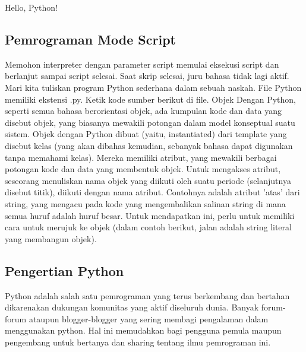 Hello, Python!

\subsection{Pemrograman Mode Script}
Memohon interpreter dengan parameter script memulai eksekusi script dan berlanjut sampai script selesai. Saat skrip selesai, juru bahasa tidak lagi aktif. Mari kita tuliskan program Python sederhana dalam sebuah naskah. File Python memiliki ekstensi .py. Ketik kode sumber berikut di ﬁle.
Objek Dengan Python, seperti semua bahasa berorientasi objek, ada kumpulan kode dan data yang disebut objek, yang biasanya mewakili potongan dalam model konseptual suatu sistem. Objek dengan Python dibuat (yaitu, instantiated) dari template yang disebut kelas (yang akan dibahas kemudian, sebanyak bahasa dapat digunakan tanpa memahami kelas). Mereka memiliki atribut, yang mewakili berbagai potongan kode dan data yang membentuk objek. Untuk mengakses atribut, seseorang menuliskan nama objek yang diikuti oleh suatu periode (selanjutnya disebut titik), diikuti dengan nama atribut.
Contohnya adalah atribut ’atas’ dari string, yang mengacu pada kode yang mengembalikan salinan string di mana semua huruf adalah huruf besar. Untuk mendapatkan ini, perlu untuk memiliki cara untuk merujuk ke objek (dalam contoh berikut, jalan adalah string literal yang membangun objek).

\subsection{Pengertian Python}
Python adalah salah satu pemrograman yang terus berkembang dan bertahan dikarenakan dukungan komunitas yang aktif diseluruh dunia. Banyak forum-forum ataupun blogger-blogger yang sering membagi pengalaman dalam menggunakan python. Hal ini memudahkan bagi pengguna pemula maupun pengembang untuk bertanya dan sharing tentang ilmu pemrograman ini. 

